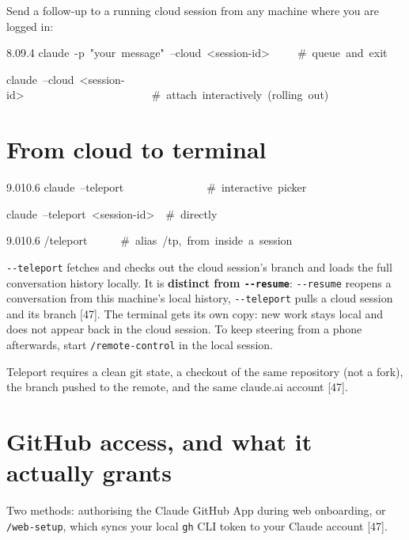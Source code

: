 \documentclass[11pt,a4paper,twoside,openany]{book}
\newcommand{\cl}[1]{\noindent\mbox{#1}\par}
\begin{document}
Send a follow-up to a running cloud session from any machine where you are logged in:


\begin{codeblock}{8.0}{9.4}
\cl{claude~-p~"your~message"~--cloud~<session-id>~~~~~\#~queue~and~exit}
\cl{claude~--cloud~<session-id>~~~~~~~~~~~~~~~~~~~~~~~\#~attach~interactively~(rolling~out)}
\end{codeblock}

\FloatBarrier
\setcounter{section}{1}
\section{From cloud to terminal}

\begin{codeblock}{9.0}{10.6}
\cl{claude~--teleport~~~~~~~~~~~~~~~\#~interactive~picker}
\cl{claude~--teleport~<session-id>~~\#~directly}
\end{codeblock}

\begin{codeblock}{9.0}{10.6}
\cl{/teleport~~~~~~\#~alias~/tp,~from~inside~a~session}
\end{codeblock}

\texttt{-\allowbreak{}-\allowbreak{}teleport} fetches and checks out the cloud session's branch and loads the full conversation history locally. It is \textbf{distinct from \texttt{-\allowbreak{}-\allowbreak{}resume}}: \texttt{-\allowbreak{}-\allowbreak{}resume} reopens a conversation from this machine's local history, \texttt{-\allowbreak{}-\allowbreak{}teleport} pulls a cloud session and its branch [47]. The terminal gets its own copy: new work stays local and does not appear back in the cloud session. To keep steering from a phone afterwards, start \texttt{/\allowbreak{}remote-\allowbreak{}control} in the local session.


Teleport requires a clean git state, a checkout of the same repository (not a fork), the branch pushed to the remote, and the same claude.ai account [47].


\FloatBarrier
\setcounter{section}{2}
\section{GitHub access, and what it actually grants}

Two methods: authorising the Claude GitHub App during web onboarding, or \texttt{/\allowbreak{}web-\allowbreak{}setup}, which syncs your local \texttt{gh} CLI token to your Claude account [47].
\end{document}
